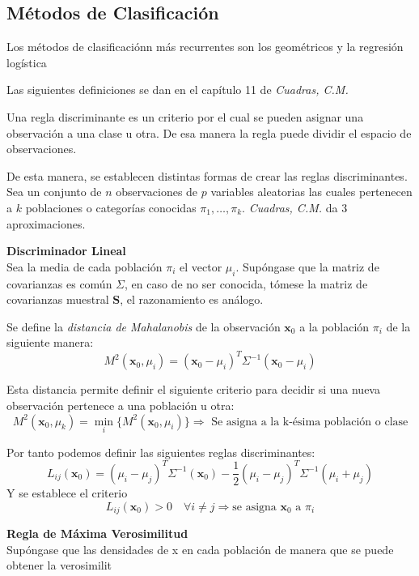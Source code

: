 \subsection{Métodos de Clasificación}

\noindent Los métodos de clasificaciónn más recurrentes son los geométricos y la regresión logística

\noindent Las siguientes definiciones se dan en el capítulo 11 de \textit{Cuadras, C.M.}\cite{Cuadras 2014}
\begin{defi}
Una regla discriminante es un criterio por el cual se pueden asignar una observación a una clase u otra. De esa manera la regla puede dividir el espacio de observaciones. 
\end{defi}

\noindent De esta manera, se establecen distintas formas de crear las reglas discriminantes. Sea un conjunto de $n$ observaciones de $p$ variables aleatorias las cuales pertenecen a $k$ poblaciones o categorías conocidas $\pi_1,\ldots,\pi_k$. \textit{Cuadras, C.M.}\cite{Cuadras 2014} da 3 aproximaciones. 

\noindent \textbf{Discriminador Lineal}\\
\noindent Sea la media de cada población  $\pi_i$ el vector $\mu_i$. Supóngase que la matriz de covarianzas es común $\Sigma$, en caso de no ser conocida, tómese la matriz de covarianzas muestral $\textbf{S}$, el razonamiento es análogo. 

\begin{defi}
Se define la \textit{distancia de Mahalanobis} de la observación $\textbf{x}_0$ a la población $\pi_i$ de la siguiente manera:
\begin{equation}
M^2(\textbf{x}_0,\mu_i)=(\textbf{x}_0-\mu_i)^T \Sigma^{-1}(\textbf{x}_0-\mu_i)
\end{equation}
\end{defi}

\noindent Esta distancia permite definir el siguiente criterio para decidir si una nueva observación pertenece a una población u otra:
\begin{equation}
M^2(\textbf{x}_0,\mu_k)=\min_{i}\lbrace M^2(\textbf{x}_0,\mu_i)\rbrace \Rightarrow \text{ Se asigna a la k-ésima población o clase}
\end{equation}

\noindent Por tanto podemos definir las siguientes reglas discriminantes:
\begin{equation}
L_{ij}(\textbf{x}_0)=(\mu_i-\mu_j)^T\Sigma^{-1}(\textbf{x}_0)-\frac{1}{2}(\mu_i-\mu_j)^T\Sigma^{-1}(\mu_i+\mu_j)
\end{equation}
Y se establece el criterio 
\begin{equation}
L_{ij}(\textbf{x}_0)> 0 \quad \forall i\neq j\Rightarrow \text{se asigna } \textbf{x}_0 \text{ a } \pi_i
\end{equation}

\noindent \textbf{Regla de Máxima Verosimilitud}\\
\noindent Supóngase que las densidades de x en cada población de manera que se puede obtener la verosimilit

